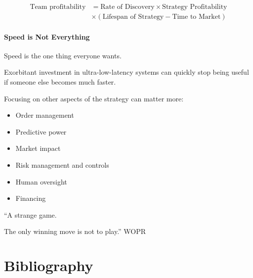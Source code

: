 \documentclass{article}
\begin{document}
\begin{align*}
	\text{Team profitability} &= \text{Rate of Discovery} \times \text{Strategy Profitability} \\
	&\times (\text{Lifespan of Strategy} - \text{Time to Market})
\end{align*}

\subsection{Speed is Not Everything}
Speed is the one thing everyone wants.

Exorbitant investment in ultra-low-latency systems can quickly stop being useful if someone else becomes much faster.

Focusing on other aspects of the strategy can matter more:
\begin{itemize}
	\item Order management
	\item Predictive power
	\item Market impact
	\item Risk management and controls
	\item Human oversight
	\item Financing
\end{itemize}

\begin{block}{}
	``A strange game.

	The only winning move is not to play.'' WOPR
\end{block}

\part{Bibliography}
\end{document}
